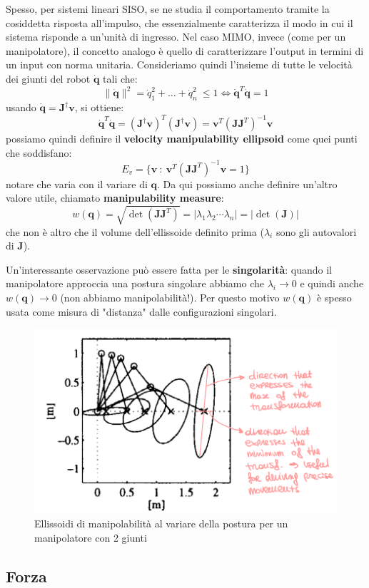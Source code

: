 Spesso, per sistemi lineari SISO, se ne studia il comportamento tramite la cosiddetta risposta all'impulso, che essenzialmente caratterizza il modo in cui il sistema risponde a un'unità di ingresso. Nel caso MIMO, invece (come per un manipolatore), il concetto analogo è quello di caratterizzare l'output in termini di un input con norma unitaria. Consideriamo quindi l'insieme di tutte le velocità dei giunti del robot $\bm{\dot{q}}$ tali che:
$$
\|\bm{\dot{q}}\|^2
= 
\dot{q}_1^2 + \dots + \dot{q}_n^2 
\ 
\leq 1
\iff
\bm{\dot{q}}^T\bm{\dot{q}} = 1
$$
usando $\bm{\dot{q}} = \bm{J}^\dagger \bm{v}$, si ottiene:
$$
\bm{\dot{q}}^T\bm{\dot{q}}
=
(\bm{J}^\dagger\bm{v})^T (\bm{J}^\dagger \bm{v})
=
\bm{v}^T (\bm{J}\bm{J}^T)^{-1}\bm{v}
$$
possiamo quindi definire il \textbf{velocity manipulability ellipsoid} come quei punti che soddisfano:
$$
E_v = \{\bm{v} \ : \ \bm{v}^T (\bm{J}\bm{J}^T)^{-1}\bm{v} = 1 \}
$$
notare che varia con il variare di $\bm{q}$. Da qui possiamo anche definire un'altro valore utile, chiamato \textbf{manipulability measure}:
$$
w(\bm{q}) = \sqrt{\det(\bm{J}\bm{J}^T)}
=
|\lambda_1\lambda_2 \cdots \lambda_n|
=
|\det(\bm{J})|
$$
che non è altro che il volume dell'ellissoide definito prima ($\lambda_i$ sono gli autovalori di $\bm{J}$).

Un'interessante osservazione può essere fatta per le \textbf{singolarità}: quando il manipolatore approccia una postura singolare abbiamo che $\lambda_i \to 0$ e quindi anche $w(\bm{q}) \to 0$ (non abbiamo manipolabilità!). Per questo motivo $w(\bm{q})$ è spesso usata come misura di "distanza" dalle configurazioni singolari.

\begin{figure}
	\centering
	\includegraphics[width=0.6\linewidth]{images/statics_5}
	\caption{Ellissoidi di manipolabilità al variare della postura per un manipolatore con 2 giunti}
	\label{fig:statics5}
\end{figure}





\subsection{Forza}

